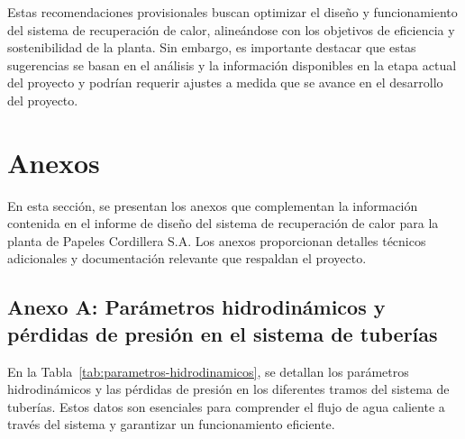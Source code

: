 \documentclass[11pt,a4paper]{article}  %
\begin{document}
Estas recomendaciones provisionales buscan optimizar el diseño y funcionamiento del sistema de recuperación de calor, alineándose con los objetivos de eficiencia y sostenibilidad de la planta. Sin embargo, es importante destacar que estas sugerencias se basan en el análisis y la información disponibles en la etapa actual del proyecto y podrían requerir ajustes a medida que se avance en el desarrollo del proyecto.

\section{Anexos}
En esta sección, se presentan los anexos que complementan la información contenida en el informe de diseño del sistema de recuperación de calor para la planta de Papeles Cordillera S.A. Los anexos proporcionan detalles técnicos adicionales y documentación relevante que respaldan el proyecto.

\subsection{Anexo A: Parámetros hidrodinámicos y pérdidas de presión en el sistema de tuberías}
En la Tabla~\ref{tab:parametros-hidrodinamicos}, se detallan los parámetros hidrodinámicos y las pérdidas de presión en los diferentes tramos del sistema de tuberías. Estos datos son esenciales para comprender el flujo de agua caliente a través del sistema y garantizar un funcionamiento eficiente.
\end{document}
